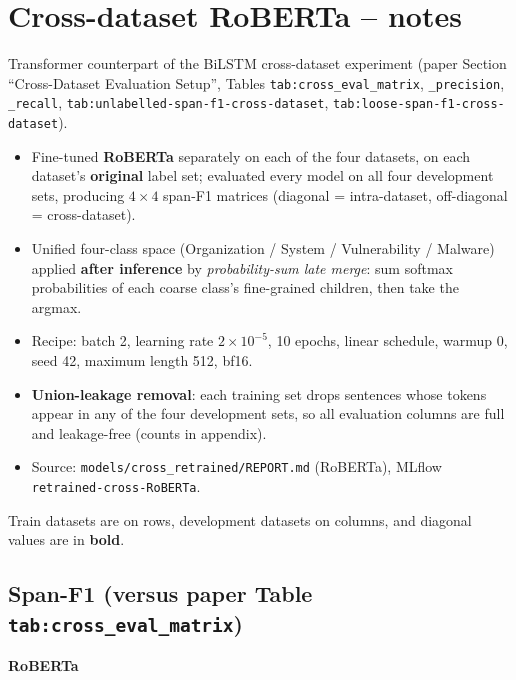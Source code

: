 \section*{Cross-dataset RoBERTa -- notes}

Transformer counterpart of the BiLSTM cross-dataset experiment (paper Section ``Cross-Dataset Evaluation Setup'', Tables \texttt{tab:cross\_eval\_matrix}, \texttt{\_precision}, \texttt{\_recall}, \texttt{tab:unlabelled-span-f1-cross-dataset}, \texttt{tab:loose-span-f1-cross-dataset}).

\begin{itemize}
\item Fine-tuned \textbf{RoBERTa} separately on each of the four datasets, on each dataset's \textbf{original} label set; evaluated every model on all four development sets, producing $4\times4$ span-F1 matrices (diagonal = intra-dataset, off-diagonal = cross-dataset).
\item Unified four-class space (Organization / System / Vulnerability / Malware) applied \textbf{after inference} by \textit{probability-sum late merge}: sum softmax probabilities of each coarse class's fine-grained children, then take the argmax.
\item Recipe: batch 2, learning rate $2\times10^{-5}$, 10 epochs, linear schedule, warmup 0, seed 42, maximum length 512, bf16.
\item \textbf{Union-leakage removal}: each training set drops sentences whose tokens appear in any of the four development sets, so all evaluation columns are full and leakage-free (counts in appendix).
\item Source: \texttt{models/cross\_retrained/REPORT.md} (RoBERTa), MLflow \texttt{retrained-cross-RoBERTa}.
\end{itemize}

Train datasets are on rows, development datasets on columns, and diagonal values are in \textbf{bold}.

\subsection*{Span-F1 (versus paper Table \texttt{tab:cross\_eval\_matrix})}

\textbf{RoBERTa}

\begin{table}[h!]
\centering
{}%
\caption{RoBERTa span-F1 on each development dataset after training on each dataset.}
\label{tab:cross_eval_matrix_roberta}
\end{table}

